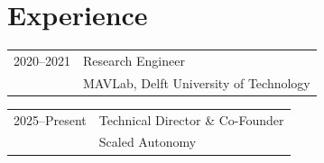 \section*{Experience}
\vspace{-10pt}
\noindent
\begin{longtable}{p{} p{}}
    2020--2021 & Research Engineer \\
    & MAVLab, Delft University of Technology
\end{longtable}
\vspace{-14pt}
\begin{longtable}{p{} p{}}
    2025--Present & Technical Director \& Co-Founder \\
    & Scaled Autonomy
\end{longtable}

